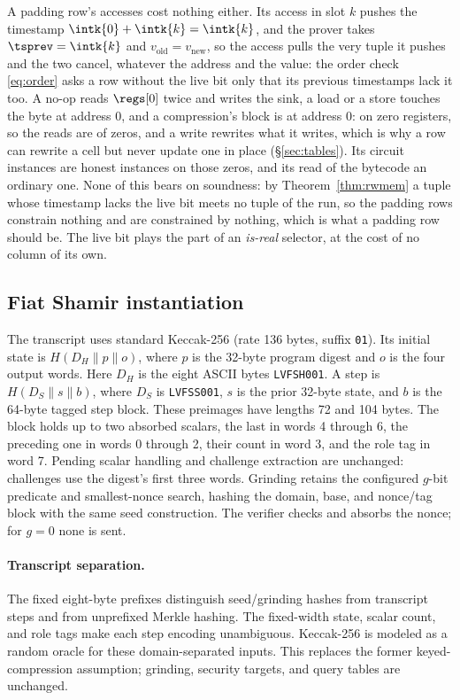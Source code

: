 A padding row's accesses cost nothing either. Its access in slot $k$ pushes the timestamp $\intk{0}+\intk{k}=\intk{k}$, and the prover takes $\tsprev=\intk{k}$ and $v_{\mathrm{old}}=v_{\mathrm{new}}$, so the access pulls the very tuple it pushes and the two cancel, whatever the address and the value: the order check \eqref{eq:order} asks a row without the live bit only that its previous timestamps lack it too. A no-op reads $\regs[0]$ twice and writes the sink, a load or a store touches the byte at address $0$, and a compression's block is at address $0$: on zero registers, so the reads are of zeros, and a write rewrites what it writes, which is why a row can rewrite a cell but never update one in place (\S\ref{sec:tables}). Its circuit instances are honest instances on those zeros, and its read of the bytecode an ordinary one. None of this bears on soundness: by Theorem~\ref{thm:rwmem} a tuple whose timestamp lacks the live bit meets no tuple of the run, so the padding rows constrain nothing and are constrained by nothing, which is what a padding row should be. The live bit plays the part of an \emph{is-real} selector, at the cost of no column of its own.

\subsection{Fiat Shamir instantiation}\label{sec:e2e-fiat-shamir}

The transcript uses standard Keccak-256 (rate 136 bytes, suffix \texttt{01}). Its initial state is $H(D_H\|p\|o)$, where $p$ is the 32-byte program digest and $o$ is the four output words. Here $D_H$ is the eight ASCII bytes \texttt{LVFSH001}. A step is $H(D_S\|s\|b)$, where $D_S$ is \texttt{LVFSS001}, $s$ is the prior 32-byte state, and $b$ is the 64-byte tagged step block. These preimages have lengths 72 and 104 bytes. The block holds up to two absorbed scalars, the last in words 4 through 6, the preceding one in words 0 through 2, their count in word 3, and the role tag in word 7. Pending scalar handling and challenge extraction are unchanged: challenges use the digest's first three words. Grinding retains the configured $g$-bit predicate and smallest-nonce search, hashing the domain, base, and nonce/tag block with the same seed construction. The verifier checks and absorbs the nonce; for $g=0$ none is sent.

\paragraph{Transcript separation.} The fixed eight-byte prefixes distinguish seed/grinding hashes from transcript steps and from unprefixed Merkle hashing. The fixed-width state, scalar count, and role tags make each step encoding unambiguous. Keccak-256 is modeled as a random oracle for these domain-separated inputs. This replaces the former keyed-compression assumption; grinding, security targets, and query tables are unchanged.

